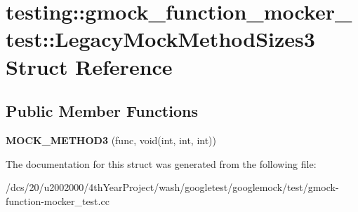 \hypertarget{structtesting_1_1gmock__function__mocker__test_1_1LegacyMockMethodSizes3}{}\section{testing\+:\+:gmock\+\_\+function\+\_\+mocker\+\_\+test\+:\+:Legacy\+Mock\+Method\+Sizes3 Struct Reference}
\label{structtesting_1_1gmock__function__mocker__test_1_1LegacyMockMethodSizes3}
\subsection*{Public Member Functions}
\begin{DoxyCompactItemize}
\item 
\mbox{\label{structtesting_1_1gmock__function__mocker__test_1_1LegacyMockMethodSizes3_a9b7dc55700e4897b6cf8122960a4b2ce}} 
{\bfseries M\+O\+C\+K\+\_\+\+M\+E\+T\+H\+O\+D3} (func, void(int, int, int))
\end{DoxyCompactItemize}


The documentation for this struct was generated from the following file\+:\begin{DoxyCompactItemize}
\item 
/dcs/20/u2002000/4th\+Year\+Project/wash/googletest/googlemock/test/gmock-\/function-\/mocker\+\_\+test.\+cc\end{DoxyCompactItemize}
